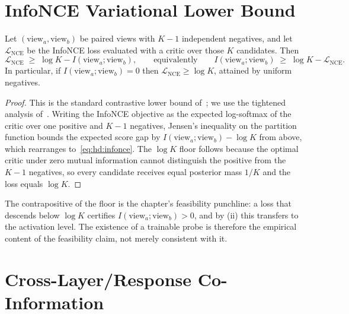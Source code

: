 \section{InfoNCE Variational Lower Bound}
\label{sec:hd-proofs:infonce}

\begin{lemma}\label{lem:hd:infonce}
Let $(\mathrm{view}_a, \mathrm{view}_b)$ be paired views with $K-1$ independent
negatives, and let $\mathcal{L}_{\mathrm{NCE}}$ be the InfoNCE loss evaluated
with a critic over those $K$ candidates. Then
\begin{equation} \mathcal{L}_{\mathrm{NCE}} \;\ge\; \log K - I(\mathrm{view}_a; \mathrm{view}_b), \qquad\text{equivalently}\qquad I(\mathrm{view}_a; \mathrm{view}_b) \;\ge\; \log K - \mathcal{L}_{\mathrm{NCE}}. \label{eq:hd:infonce} \end{equation}
In particular, if $I(\mathrm{view}_a;\mathrm{view}_b) = 0$ then
$\mathcal{L}_{\mathrm{NCE}} \ge \log K$, attained by uniform negatives.
\end{lemma}

\begin{proof}
This is the standard contrastive lower bound of~\citet{oord2018representation};
we use the tightened analysis of~\citet{poole2019variational}. Writing the
InfoNCE objective as the expected log-softmax of the critic over one positive and
$K-1$ negatives, Jensen's inequality on the partition function bounds the
expected score gap by $I(\mathrm{view}_a;\mathrm{view}_b) - \log K$ from above,
which rearranges to~\eqref{eq:hd:infonce}. The $\log K$ floor follows because the
optimal critic under zero mutual information cannot distinguish the positive from
the $K-1$ negatives, so every candidate receives equal posterior mass $1/K$ and
the loss equals $\log K$.
\end{proof}

The contrapositive of the floor is the chapter's feasibility punchline: a loss
that descends below $\log K$ certifies $I(\mathrm{view}_a;\mathrm{view}_b) > 0$,
and by (ii) this transfers to the activation level. The
existence of a trainable probe is therefore the empirical content of the
feasibility claim, not merely consistent with it.

\section{Cross-Layer/Response Co-Information}
\label{sec:hd-proofs:coinfo}

